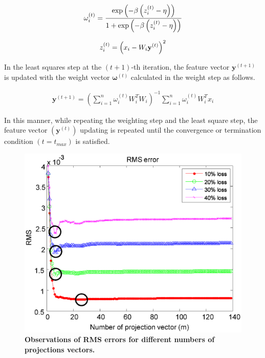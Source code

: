 \documentclass[10pt,letterpaper]{article}
\begin{document}
\begin{eqnarray}
\label{eq:sic8}
	\mathrm \mathbf{\omega}_i^{\left(t\right)} = \frac{\exp\left(-\beta\left(z_i^{\left(t\right)}-\eta\right)\right)}{1+\exp\left(-\beta\left(z_i^{\left(t\right)}-\eta \right)\right)}
\end{eqnarray}

\begin{eqnarray}
\label{eq:sic7}
	\mathrm \mathit{z_i^{\left(t\right)}} = \left(x_i-W_{i}\mathbf{y}^{\left(t\right)}\right)^2
\end{eqnarray}

In the least squares step at the $(t+1)$-th iteration, the feature vector $\textbf{y}^{(t+1)}$ is updated with the weight vector $\boldsymbol{\omega}^{(t)}$ calculated in the weight step as follows.



\begin{eqnarray}
\label{eq:sic9}
	\textbf{y}^{(t+1)} = (\sum\limits_{i=1}^{n}{\omega}_i^{(t)}{W_i^T}{W_i})^{-1}\sum\limits_{i=1}^{n}{\omega}_i^{(t)}W_i^{T}x_i
\end{eqnarray}


In this manner, while repeating the weighting step and the least square step, the feature vector $(\textbf{y}^{(t)})$ updating is repeated until the convergence or termination condition $(t=t_{max})$ is satisfied.
\begin{figure}[t]
	\centering
    \includegraphics[width=1\textwidth]{fig3_1.eps}
    \caption{\bf{Observations of RMS errors for different numbers of projections vectors.}\label{Fig. 3}}
\end{figure}
\end{document}
